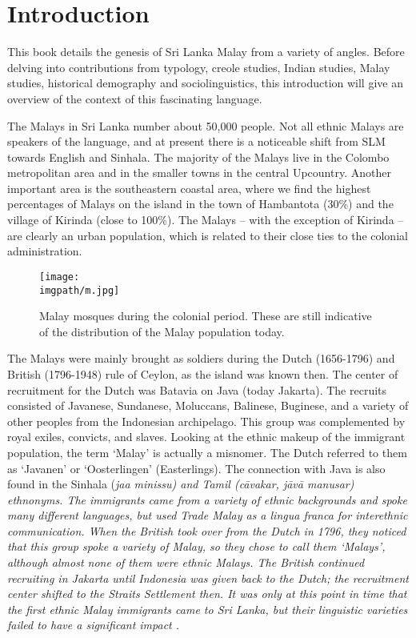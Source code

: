  
\chapter{Introduction}

This book details the genesis of Sri Lanka Malay from a variety of angles. Before delving into contributions from typology, creole studies, Indian studies, Malay studies, historical demography and sociolinguistics, this introduction will  give an overview of the context of this fascinating language.

The Malays in Sri Lanka number about 50,000 people. Not all ethnic Malays are speakers of the language, and at present there is a noticeable shift from SLM towards English and Sinhala. The majority of the Malays live in the Colombo metropolitan area and in the smaller towns in the central Upcountry. Another important area is the southeastern coastal area, where we find the highest percentages of Malays on the island in the town of Hambantota (30\%) and the village of Kirinda (close to 100\%). The Malays -- with the exception of Kirinda --  are clearly an urban population, which is related to their close ties to the colonial administration.

\begin{figure}
\centering
\texttt{[image: \\imgpath/m.jpg]}
 \caption[Malay mosques during the colonial period]{Malay mosques during the colonial period. These are still indicative of the distribution of the Malay population today.}
\end{figure}



The Malays were mainly brought as soldiers during the Dutch (1656-1796) and British (1796-1948) rule of Ceylon, as the island was known then. The center of recruitment for the Dutch was Batavia on Java (today Jakarta). The recruits consisted of Javanese, Sundanese, Moluccans, Balinese, Buginese, and a variety of other peoples from the Indonesian archipelago. This group was complemented by royal exiles, convicts, and slaves. 
Looking at the ethnic makeup of the immigrant population, the term `Malay' is actually a misnomer. The Dutch referred to  them as `Javanen' or `Oosterlingen' (Easterlings). The connection with Java is also found in the Sinhala (\em jaa minissu\em) and Tamil (\em c\=avakar, j\=av\=a manusar\em) ethnonyms.
The immigrants came from a variety of ethnic backgrounds and spoke many different languages, but used Trade Malay as a lingua franca for interethnic communication. When the British took over from the Dutch in 1796, they noticed that this group spoke a variety of Malay, so they chose to call them `Malays', although almost none of them were ethnic Malays. The British continued recruiting in Jakarta until Indonesia was given back to the Dutch; the recruitment center shifted to the Straits Settlement then. It was only at this point in time that the first ethnic Malay immigrants came to Sri Lanka, but their linguistic varieties failed to have a significant impact \citep[see][]{Paauwtv}.

